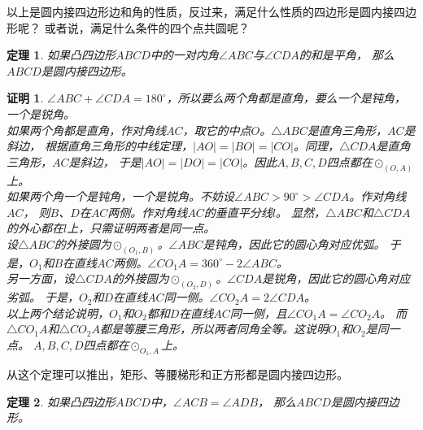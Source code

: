 \documentclass[12pt,UTF8]{ctexbook}
\newtheorem{tm}{定理}[section]
\newtheorem*{proof2}{证明}
\begin{document}
以上是圆内接四边形边和角的性质，反过来，满足什么性质的四边形是圆内接四边形呢？
或者说，满足什么条件的四个点共圆呢？

\begin{tm}\label{tm:0-3-0}
    如果凸四边形$ABCD$中的一对内角$\angle ABC$与$\angle CDA$的和是平角，
    那么$ABCD$是圆内接四边形。
\end{tm}

\begin{proof2}
    $\angle ABC + \angle CDA = 180^\circ$，所以要么两个角都是直角，要么一个是钝角，一个是锐角。\\
    如果两个角都是直角，作对角线$AC$，取它的中点$O$。$\triangle ABC$是直角三角形，$AC$是斜边，
    根据直角三角形的中线定理，$|AO| = |BO| = |CO|$。同理，$\triangle CDA$是直角三角形，$AC$是斜边，
    于是$|AO| = |DO| = |CO|$。因此$A,B,C,D$四点都在$\odot_{(O, A)}$上。\\
    如果两个角一个是钝角，一个是锐角。不妨设$\angle ABC > 90^\circ > \angle CDA$。作对角线$AC$，
    则$B$、$D$在$AC$两侧。作对角线$AC$的垂直平分线$l$。
    显然，$\triangle ABC$和$\triangle CDA$的外心都在$l$上，只需证明两者是同一点。\\
    设$\triangle ABC$的外接圆为$\odot_{(O_1, B)}$。$\angle ABC$是钝角，因此它的圆心角对应优弧。
    于是，$O_1$和$B$在直线$AC$两侧。$\angle CO_1A = 360^\circ - 2\angle ABC$。\\
    另一方面，设$\triangle CDA$的外接圆为$\odot_{(O_2, D)}$。$\angle CDA$是锐角，因此它的圆心角对应劣弧。
    于是，$O_2$和$D$在直线$AC$同一侧。$\angle CO_2A = 2\angle CDA$。\\
    以上两个结论说明，$O_1$和$O_2$都和$D$在直线$AC$同一侧，且$\angle CO_1A = \angle CO_2A$。
    而$\triangle CO_1A$和$\triangle CO_2A$都是等腰三角形，所以两者同角全等。这说明$O_1$和$O_2$是同一点。
    $A,B,C,D$四点都在$\odot_{O_1, A}$上。
\end{proof2}

从这个定理可以推出，矩形、等腰梯形和正方形都是圆内接四边形。

\begin{tm}\label{tm:0-3-10}
    如果凸四边形$ABCD$中，$\angle ACB = \angle ADB$，
    那么$ABCD$是圆内接四边形。
\end{tm}
\end{document}
